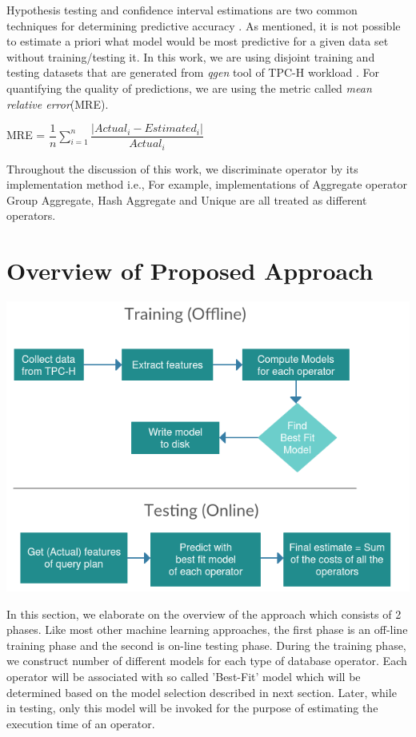 \documentclass{article}
\begin{document}
\begin{multicols}{2}
	Hypothesis testing and confidence interval estimations are two common
techniques for determining predictive accuracy \cite{forecasting}. As mentioned, 
it is not possible to estimate a priori what model would be
most predictive for a given data set without training/testing it. In this work, we are using
disjoint training and testing datasets that are generated from \textit{qgen} tool of TPC-H workload 		\cite{TPCH}. For quantifying the quality of predictions, we are using the metric called \textit{mean relative error}(MRE).
	\begin{center}
	MRE  = $\dfrac{1}{n} \sum\limits_{i=1}^n \dfrac{\left| Actual_{i} - Estimated_{i} \right|}{Actual_{i}}$
	\end{center}

Throughout the discussion of this work, we discriminate operator by its implementation method i.e., For example, implementations of Aggregate operator Group Aggregate, Hash Aggregate and Unique are all treated as different operators.

	\section{Overview of Proposed Approach}
	
	\includegraphics[scale=0.4]{training.png}

	In this section, we elaborate on the overview of the approach which consists of 2 phases. Like 
	most other machine learning approaches, the first phase is an off-line training phase and the 
	second is on-line testing phase.
	During the training phase, we construct number of different 
	models for each type of database operator. Each operator will be associated with so called 'Best-Fit' 		model which will be determined 
	based on the model selection described in next section. Later, while in testing, only this model will 		be invoked for the purpose of estimating the execution time of an operator. 


\end{multicols}
\end{document}
